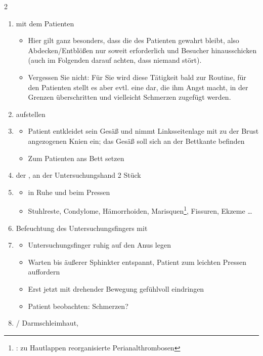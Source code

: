 \clearpage
\begin{WidePar}
\begin{multicols}{2}
\begin{enumerate}
  \item {} mit dem Patienten
  \begin{itemize}
    \item Hier gilt ganz besonders, dass die
     des Patienten gewahrt bleibt, also Abdecken/Entblößen nur soweit erforderlich und
    Besucher hinausschicken (auch im Folgenden darauf achten, dass niemand
    stört).
    \item Vergessen Sie nicht: Für Sie wird diese Tätigkeit bald zur Routine,
    für den Patienten stellt es aber evtl. eine
     dar, die ihm Angst macht, in der
    Grenzen überschritten und vielleicht Schmerzen zugefügt werden.
  \end{itemize}
  \item {} aufstellen
  \item {}
  \begin{itemize}
    \item Patient entkleidet sein Gesäß und
    nimmt Linksseitenlage mit zu der Brust angezogenen Knien
    ein; das Gesäß soll sich an der Bettkante befinden
    \item Zum Patienten ans Bett setzen
  \end{itemize}
  \item {} der
  , an der Untersuchungshand 2 Stück
  \item {}
  \begin{itemize}
    \item in Ruhe und beim Pressen
    \item[\eye] Stuhlreste, Condylome, Hämorrhoiden,
    Marisquen\footnote{: zu Hautlappen
    reorganisierte Perianalthrombosen}, Fissuren, Ekzeme \dots
  \end{itemize}
  \item Befeuchtung des Untersuchungsfingers mit
  \item {}
  \begin{itemize}
    \item Untersuchungsfinger ruhig auf den Anus legen
    \item Warten bis äußerer Sphinkter entspannt, Patient
    zum leichten Pressen auffordern
    \item Erst jetzt mit drehender Bewegung gefühlvoll
    eindringen
    \item {Patient beobachten: Schmerzen?}
  \end{itemize}
  \item {} / Darmschleimhaut,
  

\end{enumerate}
\end{multicols}
\end{WidePar}
